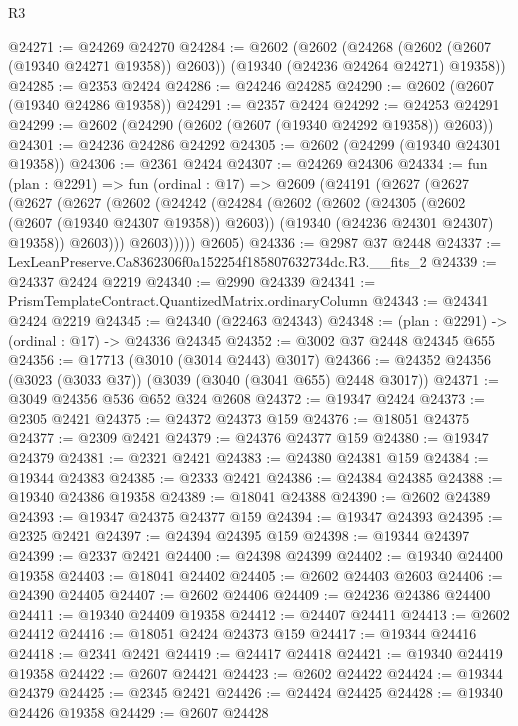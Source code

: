 \begin{lexlean}{R3}
\begin{coremodule}
@24271 := @24269 @24270
@24284 := @2602
    (@2602
      (@24268 (@2602 (@2607 (@19340 @24271 @19358)) @2603))
      (@19340 (@24236 @24264 @24271) @19358))
@24285 := @2353 @2424
@24286 := @24246 @24285
@24290 := @2602 (@2607 (@19340 @24286 @19358))
@24291 := @2357 @2424
@24292 := @24253 @24291
@24299 := @2602 (@24290 (@2602 (@2607 (@19340 @24292 @19358)) @2603))
@24301 := @24236 @24286 @24292
@24305 := @2602 (@24299 (@19340 @24301 @19358))
@24306 := @2361 @2424
@24307 := @24269 @24306
@24334 := fun (plan : @2291) =>
  fun (ordinal : @17) =>
  @2609
    (@24191
      (@2627
        (@2627
          (@2627
            (@2627
              (@2602
                (@24242
                  (@24284
                    (@2602
                      (@2602
                        (@24305 (@2602 (@2607 (@19340 @24307 @19358)) @2603))
                        (@19340 (@24236 @24301 @24307) @19358))
                      @2603)))
                @2603)))))
      @2605)
@24336 := @2987 @37 @2448
@24337 := LexLeanPreserve.Ca8362306f0a152254f185807632734dc.R3.__fits_2
@24339 := @24337 @2424 @2219
@24340 := @2990 @24339
@24341 := PrismTemplateContract.QuantizedMatrix.ordinaryColumn
@24343 := @24341 @2424 @2219
@24345 := @24340 (@22463 @24343)
@24348 := (plan : @2291) -> (ordinal : @17) -> @24336 @24345
@24352 := @3002 @37 @2448 @24345 @655
@24356 := @17713 (@3010 (@3014 @2443) @3017)
@24366 := @24352 @24356 (@3023 (@3033 @37)) (@3039 (@3040 (@3041 @655) @2448 @3017))
@24371 := @3049 @24356 @536 @652 @324 @2608
@24372 := @19347 @2424
@24373 := @2305 @2421
@24375 := @24372 @24373 @159
@24376 := @18051 @24375
@24377 := @2309 @2421
@24379 := @24376 @24377 @159
@24380 := @19347 @24379
@24381 := @2321 @2421
@24383 := @24380 @24381 @159
@24384 := @19344 @24383
@24385 := @2333 @2421
@24386 := @24384 @24385
@24388 := @19340 @24386 @19358
@24389 := @18041 @24388
@24390 := @2602 @24389
@24393 := @19347 @24375 @24377 @159
@24394 := @19347 @24393
@24395 := @2325 @2421
@24397 := @24394 @24395 @159
@24398 := @19344 @24397
@24399 := @2337 @2421
@24400 := @24398 @24399
@24402 := @19340 @24400 @19358
@24403 := @18041 @24402
@24405 := @2602 @24403 @2603
@24406 := @24390 @24405
@24407 := @2602 @24406
@24409 := @24236 @24386 @24400
@24411 := @19340 @24409 @19358
@24412 := @24407 @24411
@24413 := @2602 @24412
@24416 := @18051 @2424 @24373 @159
@24417 := @19344 @24416
@24418 := @2341 @2421
@24419 := @24417 @24418
@24421 := @19340 @24419 @19358
@24422 := @2607 @24421
@24423 := @2602 @24422
@24424 := @19344 @24379
@24425 := @2345 @2421
@24426 := @24424 @24425
@24428 := @19340 @24426 @19358
@24429 := @2607 @24428

\end{coremodule}
\end{lexlean}
